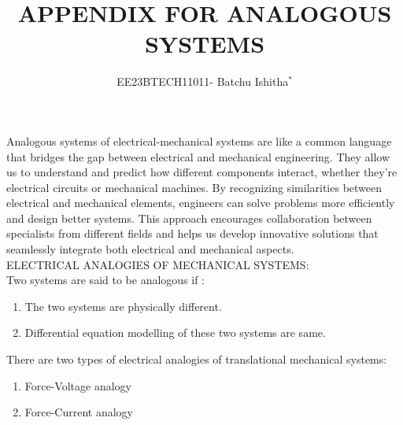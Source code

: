 \documentclass[journal,12pt,onecolumn]{IEEEtran}
\theoremstyle{remark}
\begin{document}
\newcommand\tabref{Table~\ref}
\newcommand{\sinc}{\,\text{sinc}\,}
\newcommand{\rect}{\,\text{rect}\,}

\let\vec\mathbf



\title{ APPENDIX FOR ANALOGOUS SYSTEMS}
\author{EE23BTECH11011- Batchu Ishitha$^{*}$%
}
\maketitle




\bigskip

\renewcommand{\thefigure}{\theenumi}
\renewcommand{\thetable}{\theenumi}

Analogous systems of electrical-mechanical systems are like a common language that bridges the gap between electrical and mechanical engineering. They allow us to understand and predict how different components interact, whether they're electrical circuits or mechanical machines. By recognizing similarities between electrical and mechanical elements, engineers can solve problems more efficiently and design better systems. This approach encourages collaboration between specialists from different fields and helps us develop innovative solutions that seamlessly integrate both electrical and mechanical aspects. \\

ELECTRICAL ANALOGIES OF MECHANICAL SYSTEMS:\\

Two systems are said to be analogous if :
\begin{enumerate}
\item The two systems are physically different.
\item Differential equation modelling of these two systems are same.
\end{enumerate} 


There are two types of electrical analogies of translational mechanical systems:
\begin{enumerate}
\item Force-Voltage analogy
\item Force-Current analogy
\end{enumerate} 
\end{document}
